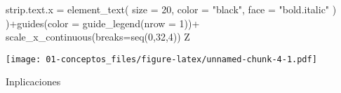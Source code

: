 \documentclass[
]{book}
\newenvironment{Shaded}{\begin{snugshade}}{\end{snugshade}}
\newcommand{\AttributeTok}[1]{\textcolor[rgb]{0.77,0.63,0.00}{#1}}
\newcommand{\DecValTok}[1]{\textcolor[rgb]{0.00,0.00,0.81}{#1}}
\newcommand{\FunctionTok}[1]{\textcolor[rgb]{0.00,0.00,0.00}{#1}}
\newcommand{\NormalTok}[1]{#1}
\newcommand{\SpecialCharTok}[1]{\textcolor[rgb]{0.00,0.00,0.00}{#1}}
\newcommand{\StringTok}[1]{\textcolor[rgb]{0.31,0.60,0.02}{#1}}
\begin{document}
\begin{Shaded}
\begin{Highlighting}[]
           \AttributeTok{strip.text.x =} \FunctionTok{element\_text}\NormalTok{(}
             \AttributeTok{size =} \DecValTok{20}\NormalTok{, }\AttributeTok{color =} \StringTok{"black"}\NormalTok{, }\AttributeTok{face =} \StringTok{"bold.italic"}
\NormalTok{           )}
\NormalTok{)}\SpecialCharTok{+}\FunctionTok{guides}\NormalTok{(}\AttributeTok{color =} \FunctionTok{guide\_legend}\NormalTok{(}\AttributeTok{nrow =} \DecValTok{1}\NormalTok{))}\SpecialCharTok{+}
  \FunctionTok{scale\_x\_continuous}\NormalTok{(}\AttributeTok{breaks=}\FunctionTok{seq}\NormalTok{(}\DecValTok{0}\NormalTok{,}\DecValTok{32}\NormalTok{,}\DecValTok{4}\NormalTok{))}
\NormalTok{Z}
\end{Highlighting}
\end{Shaded}

\texttt{[image: 01-conceptos\_files/figure-latex/unnamed-chunk-4-1.pdf]}

Inplicaciones
\end{document}
